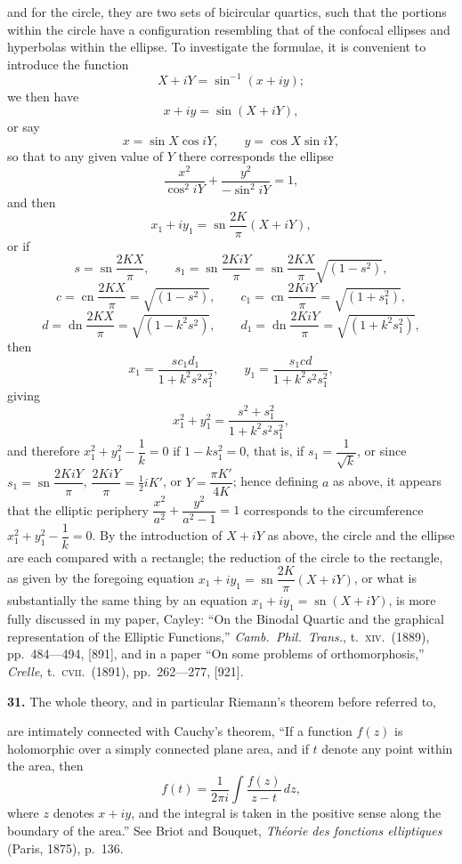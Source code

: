 \documentclass[11pt,a4paper]{article}
\providecommand{\sn}{\operatorname{sn}}
\providecommand{\cn}{\operatorname{cn}}
\providecommand{\dn}{\operatorname{dn}}
\begin{document}
and for the circle, they are two sets of bicircular quartics, such that the portions within the circle have a configuration resembling that of the confocal ellipses and hyperbolas within the ellipse. To investigate the formulae, it is convenient to introduce the function
\[
X + iY = \sin^{-1}(x + iy);
\]
we then have
\[
x + iy = \sin(X + iY),
\]
or say
\[
x = \sin X \cos iY, \qquad y = \cos X \sin iY,
\]
so that to any given value of $Y$ there corresponds the ellipse
\[
\frac{x^2}{\cos^2 iY} + \frac{y^2}{-\sin^2 iY} = 1,
\]
and then
\[
x_1 + i y_1 = \sn\frac{2K}{\pi}(X + iY),
\]
or if
\[
s = \sn\frac{2KX}{\pi}, \qquad s_1 = \sn\frac{2KiY}{\pi} = \sn\frac{2KX}{\pi}\sqrt{(1 - s^2)},
\]
\[
c = \cn\frac{2KX}{\pi} = \sqrt{(1 - s^2)}, \qquad c_1 = \cn\frac{2KiY}{\pi} = \sqrt{(1 + s_1^2)},
\]
\[
d = \dn\frac{2KX}{\pi} = \sqrt{(1 - k^2 s^2)}, \qquad d_1 = \dn\frac{2KiY}{\pi} = \sqrt{(1 + k^2 s_1^2)},
\]
then
\[
x_1 = \frac{s c_1 d_1}{1 + k^2 s^2 s_1^2}, \qquad y_1 = \frac{s_1 c d}{1 + k^2 s^2 s_1^2},
\]
giving
\[
x_1^2 + y_1^2 = \frac{s^2 + s_1^2}{1 + k^2 s^2 s_1^2},
\]
and therefore $x_1^2 + y_1^2 - \dfrac{1}{k} = 0$ if $1 - k s_1^2 = 0$, that is, if $s_1 = \dfrac{1}{\sqrt{k}}$, or since $s_1 = \sn\dfrac{2KiY}{\pi}$, $\dfrac{2KiY}{\pi} = \tfrac{1}{2}i K'$, or $Y = \dfrac{\pi K'}{4K}$;
hence defining $a$ as above, it appears that the elliptic periphery $\dfrac{x^2}{a^2} + \dfrac{y^2}{a^2 - 1} = 1$ corresponds to the circumference $x_1^2 + y_1^2 - \dfrac{1}{k} = 0$. By the introduction of $X + iY$ as above, the circle and the ellipse are each compared with a rectangle; the reduction of the circle to the rectangle, as given by the foregoing equation $x_1 + iy_1 = \sn\dfrac{2K}{\pi}(X + iY)$, or what is substantially the same thing by an equation $x_1 + iy_1 = \sn(X + iY)$, is more fully discussed in my paper, Cayley: ``On the Binodal Quartic and the graphical representation of the Elliptic Functions,'' \textit{Camb.\ Phil.\ Trans.}, t.~\textsc{xiv}.\ (1889), pp.\ 484---494, [891], and in a paper ``On some problems of orthomorphosis,'' \textit{Crelle}, t.~\textsc{cvii}.\ (1891), pp.\ 262---277, [921].

\textbf{31.} The whole theory, and in particular Riemann's theorem before referred to,

are intimately connected with Cauchy's theorem, ``If a function $f(z)$ is holomorphic over a simply connected plane area, and if $t$ denote any point within the area, then
\[
f(t) = \frac{1}{2\pi i}\int \frac{f(z)}{z - t}\,dz,
\]
where $z$ denotes $x + iy$, and the integral is taken in the positive sense along the boundary of the area.'' See Briot and Bouquet, \textit{Th\'eorie des fonctions elliptiques} (Paris, 1875), p.~136.
\end{document}
